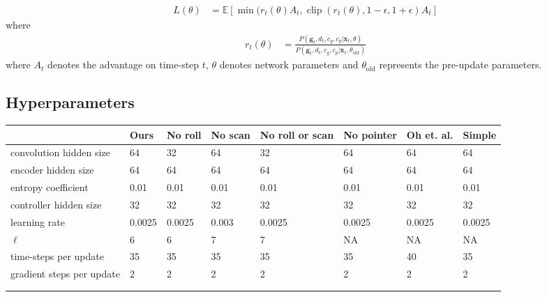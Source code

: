 \documentclass{article}
\DeclareMathOperator{\clip}{clip}
\begin{document}
\begin{align}
	L(\theta) &= \mathbb{E}[\min(r_t(\theta)A_t, \clip\left(r_t(\theta), 1 - \epsilon, 1 +
	\epsilon\right)A_t]
\end{align}
where
\begin{align}
	r_t(\theta) &= \frac{P(\mathbf{g}_t, d_t, c_g, c_p|\mathbf{x}_t, \theta)}{P(\mathbf{g}_t, d_t, c_g, c_p|\mathbf{x}_t, \theta_{\text{old}})}
\end{align}
where $A_t$ denotes the advantage on time-step $t$, $\theta$ denotes network parameters and $\theta_\text{old}$ represents the pre-update parameters.
\begin{landscape}
\subsection{Hyperparameters}

\begin{tabular}{l|lllllll}
                          & Ours   & No roll & No scan & No roll or scan & No pointer & Oh et. al. & Simple \\
                          \hline

convolution hidden size   & 64     & 32      & 64      & 32              & 64         & 64         & 64     \\
encoder hidden size       & 64     & 64      & 64      & 64              & 64         & 64         & 64     \\
entropy coefficient       & 0.01   & 0.01    & 0.01    & 0.01            & 0.01       & 0.01       & 0.01   \\
controller hidden size    & 32     & 32      & 32      & 32              & 32         & 32         & 32     \\
learning rate             & 0.0025 & 0.0025  & 0.003   & 0.0025          & 0.0025     & 0.0025     & 0.0025 \\
$\ell$                    & 6      & 6       & 7       & 7               & NA         & NA         & NA     \\
time-steps per update     & 35     & 35      & 35      & 35              & 35         & 40         & 35     \\
gradient steps per update & 2      & 2       & 2       & 2               & 2          & 2          & 2      \\
                          &        &         &         &                 &            &            &        \\
                          &        &         &         &                 &            &            &       
\end{tabular}
\end{landscape}
\end{document}
